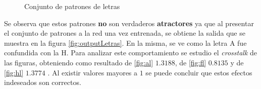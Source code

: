 \documentclass{sig-alternate}
\begin{document}
	\begin{figure}[h]
		\begin{center}
			\hspace{20pt}
			\hspace{20pt}
		\end{center}
	\caption{Conjunto de patrones de letras}
	\label{fig:letras}
	\end{figure}

 Se observa que estos patrones \textbf{no} son verdaderos \textbf{atractores} ya que al presentar el conjunto de patrones a la red una vez entrenada, se obtiene la salida que se muestra en la figura \ref{fig:outputLetras}. En la misma, se ve como la letra A fue confundida con la H. Para analizar este comportamiento se estudio el \textit{crosstalk} de las figuras, obteniendo como resultado de \ref{fig:al}  $1.3188$, de \ref{fig:fl} $0.8135$ y de \ref{fig:hl} $1.3774$ . Al existir valores mayores a $1$ se puede concluir que estos efectos indeseados son correctos.
\end{document}
